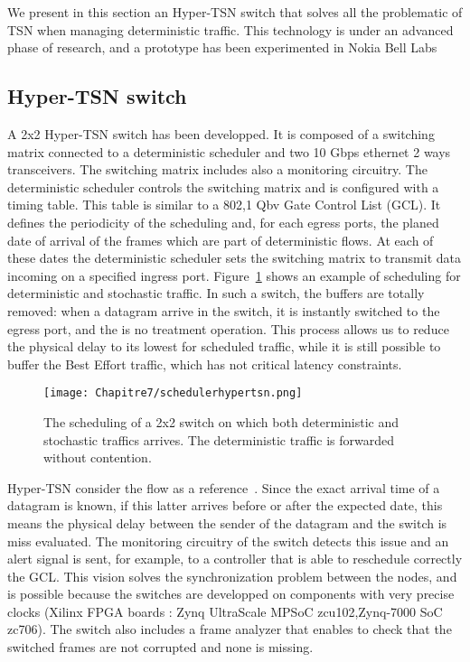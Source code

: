 We present in this section an Hyper-TSN switch that solves all the problematic of TSN when managing deterministic traffic.
This technology is under an advanced phase of research, and a prototype has been experimented in Nokia Bell Labs~\cite{guiraudleclercmarce2021}

\subsection{Hyper-TSN switch}


A 2x2 Hyper-TSN switch has been developped. It is composed of a switching matrix connected to a deterministic scheduler and two 10 Gbps ethernet 2 ways transceivers. The switching matrix includes also a monitoring circuitry. The deterministic scheduler controls the switching matrix and is configured with a timing table. This table is similar to a 802,1 Qbv Gate Control List (GCL). It defines the periodicity of the scheduling and, for each egress ports, the planed date of arrival of the frames which are part of deterministic flows. At each of these dates the deterministic scheduler sets the switching matrix to transmit data incoming on a specified ingress port. Figure~\ref{fig:schedulehtsn} shows an example of scheduling for deterministic and stochastic traffic.
 In such a switch, the buffers are totally removed: when a datagram arrive in the switch, it is instantly switched to the egress port, and the is no treatment operation. This process allows us to reduce the physical delay to its lowest for scheduled traffic, while it is still possible to buffer the Best Effort traffic, which has not critical latency constraints.
\begin{center}

\begin{figure}[h]
  \centering
\texttt{[image: Chapitre7/schedulerhypertsn.png]}
\caption{ The scheduling of a 2x2 switch on which both deterministic and stochastic traffics arrives. The deterministic traffic is forwarded without contention.}
\label{fig:schedulehtsn}
\end{figure}
\end{center}

Hyper-TSN consider the flow as a reference~\cite{leclerc2020optical}. Since the exact arrival time of a datagram is known, if this latter arrives before or after the expected date, this means the physical delay between the sender of the datagram and the switch is miss evaluated. The monitoring circuitry of the switch detects this issue and an alert signal is sent, for example, to a controller that is able to reschedule correctly the GCL.
This vision solves the synchronization problem between the nodes, and is possible because the switches are developped on components with very precise clocks (Xilinx FPGA boards : Zynq UltraScale MPSoC zcu102,Zynq-7000 SoC zc706). 
The switch also includes a frame analyzer that enables to check that the switched frames are not corrupted and none is missing.

